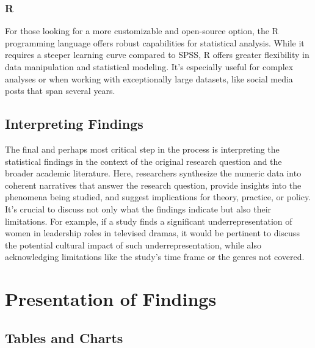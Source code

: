 \documentclass[
  b5paper]{book}
\begin{document}
\hypertarget{r}{%
\subsubsection*{R}\label{r}}

For those looking for a more customizable and open-source option, the R programming language offers robust capabilities for statistical analysis. While it requires a steeper learning curve compared to SPSS, R offers greater flexibility in data manipulation and statistical modeling. It's especially useful for complex analyses or when working with exceptionally large datasets, like social media posts that span several years.

\hypertarget{interpreting-findings}{%
\subsection*{Interpreting Findings}\label{interpreting-findings}}

The final and perhaps most critical step in the process is interpreting the statistical findings in the context of the original research question and the broader academic literature. Here, researchers synthesize the numeric data into coherent narratives that answer the research question, provide insights into the phenomena being studied, and suggest implications for theory, practice, or policy. It's crucial to discuss not only what the findings indicate but also their limitations. For example, if a study finds a significant underrepresentation of women in leadership roles in televised dramas, it would be pertinent to discuss the potential cultural impact of such underrepresentation, while also acknowledging limitations like the study's time frame or the genres not covered.

\hypertarget{presentation-of-findings}{%
\section{Presentation of Findings}\label{presentation-of-findings}}

\hypertarget{tables-and-charts}{%
\subsection*{Tables and Charts}\label{tables-and-charts}}
\end{document}
